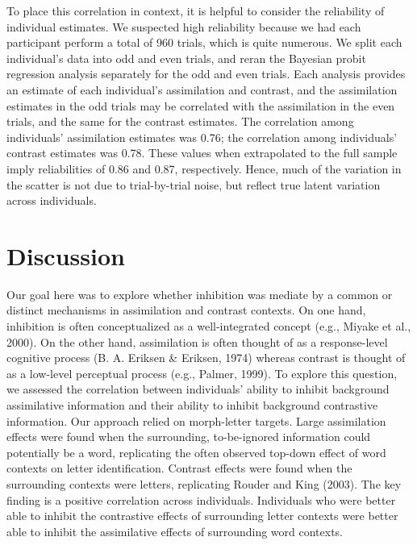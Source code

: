 \documentclass[english,floatsintext,man]{apa6}
\theoremstyle{definition}
\theoremstyle{definition}
\theoremstyle{definition}
\theoremstyle{remark}
\begin{document}
To place this correlation in context, it is helpful to consider the
reliability of individual estimates. We suspected high reliability
because we had each participant perform a total of 960 trials, which is
quite numerous. We split each individual's data into odd and even
trials, and reran the Bayesian probit regression analysis separately for
the odd and even trials. Each analysis provides an estimate of each
individual's assimilation and contrast, and the assimilation estimates
in the odd trials may be correlated with the assimilation in the even
trials, and the same for the contrast estimates. The correlation among
individuals' assimilation estimates was 0.76; the correlation among
individuals' contrast estimates was 0.78. These values when extrapolated
to the full sample imply reliabilities of 0.86 and 0.87, respectively.
Hence, much of the variation in the scatter is not due to trial-by-trial
noise, but reflect true latent variation across individuals.

\section{Discussion}\label{discussion}

Our goal here was to explore whether inhibition was mediate by a common
or distinct mechanisms in assimilation and contrast contexts. On one
hand, inhibition is often conceptualized as a well-integrated concept
(e.g., Miyake et al., 2000). On the other hand, assimilation is often
thought of as a response-level cognitive process (B. A. Eriksen \&
Eriksen, 1974) whereas contrast is thought of as a low-level perceptual
process (e.g., Palmer, 1999). To explore this question, we assessed the
correlation between individuals' ability to inhibit background
assimilative information and their ability to inhibit background
contrastive information. Our approach relied on morph-letter targets.
Large assimilation effects were found when the surrounding,
to-be-ignored information could potentially be a word, replicating the
often observed top-down effect of word contexts on letter
identification. Contrast effects were found when the surrounding
contexts were letters, replicating Rouder and King (2003). The key
finding is a positive correlation across individuals. Individuals who
were better able to inhibit the contrastive effects of surrounding
letter contexts were better able to inhibit the assimilative effects of
surrounding word contexts.
\end{document}
